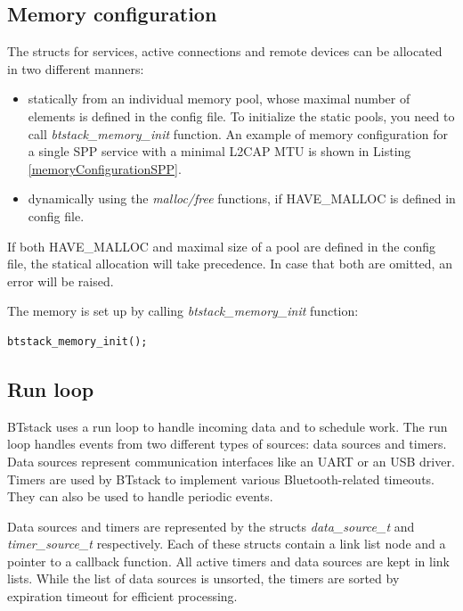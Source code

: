 \documentclass[a4paper,titlepage,oneside,12pt]{amsart} %
\begin{document}
\subsection{Memory configuration}
\label{section:memory_configuration}

The structs for services, active connections and remote devices can be allocated in two different manners: 
        \begin{itemize}
        \item statically from an individual memory pool, whose maximal number of elements  is defined in the config file. To initialize the static pools, you need to call \emph{btstack\_memory\_init} function. An example of memory configuration for a single SPP service with a minimal L2CAP MTU is shown in Listing \ref{memoryConfigurationSPP}.
        \item dynamically using the \emph{malloc/free} functions, if HAVE\_MALLOC is defined in config file. 
        \end{itemize}

If both HAVE\_MALLOC and  maximal size of a pool are defined in the config file, the statical allocation will take precedence. In case that both are omitted, an error will be raised.

The memory is set up by calling \emph{btstack\_memory\_init} function:
\begin{lstlisting}
btstack_memory_init();
\end{lstlisting}


\subsection{Run loop}
\label{section:run_loop}

BTstack uses a run loop to handle incoming data and to schedule work. The run loop handles events from two different types of sources: data sources and timers. Data sources represent communication interfaces like an UART or an USB driver. Timers are used by BTstack to implement various Bluetooth-related timeouts. They can also be used to handle periodic events. 

Data sources and timers are represented by the  structs \emph{data\_source\_t} and \emph{timer\_source\_t} respectively. Each of these structs contain a link list node and a pointer to a callback function. All active timers and data sources are kept in link lists. While the list of data sources is unsorted, the timers are sorted by expiration timeout for efficient processing.
\end{document}
